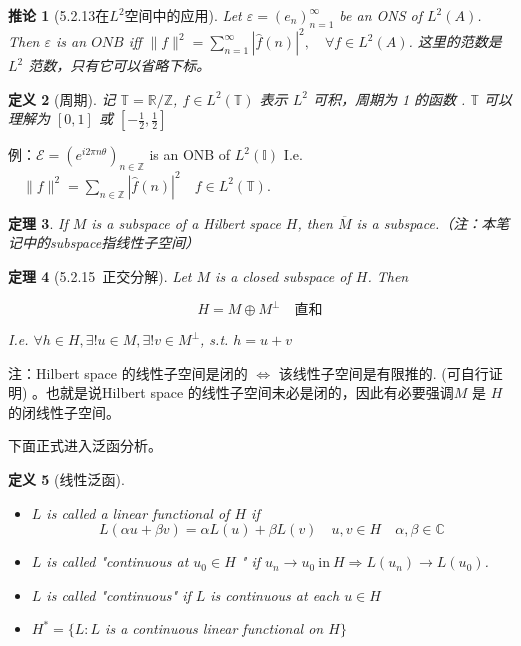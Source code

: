\documentclass[10pt,openany]{book}
\theoremstyle{thmstyle} %
\newtheorem{theorem}{定理}[chapter]
\theoremstyle{defstyle} %
\newtheorem{definition}[theorem]{定义}
\newtheorem{corollary}[theorem]{推论}
\theoremstyle{prostyle} %
\begin{document}
\begin{corollary}[5.2.13在$L^2$空间中的应用]
Let $\varepsilon=\left(e_n\right)_{n=1}^{\infty}$ be an ONS of $L^2(A)$. Then $\varepsilon$ is an $O N B$ iff $\|f\|^2=\sum_{n=1}^{\infty}|\hat{f}(n)|^2, \quad \forall f \in L^2(A)$. 这里的范数是 $L^2$ 范数，只有它可以省略下标。
\end{corollary}

\begin{definition}[周期]
记 $\mathbb{T}=\mathbb{R} / \mathbb{Z}$, $ f \in L^2(\mathbb{T})$ 表示  $L^2$  可积，周期为 1 的函数 . $\mathbb{T}$ 可以理解为 $[0,1]$ 或 $[-\frac{1}{2},\frac{1}{2}]$
\end{definition}

例：$\mathcal{E}=\left(e^{i 2 \pi n \theta}\right)_{n \in \mathbb{Z}}$ is an ONB of $L^2(\mathbb{I})$ I.e. $\quad\|f\|^2=\sum_{n \in \mathbb{Z}}|\hat{f}(n)|^2 \quad f \in L^2(\mathbb{T})$.

\begin{theorem}
If $M$ is a subspace of a Hilbert space $H$, then $\overline{M}$ is a subspace.（注：本笔记中的subspace指线性子空间）
\end{theorem}

\begin{theorem}[5.2.15~正交分解] 
Let $M$ is a closed subspace of $H$. Then

$$
H=M \oplus M^{\perp} \quad \text{直和}
$$

I.e. $\forall h \in H, \exists!u \in M, \exists!v \in M^{\perp}$, s.t. $h=u+v$
\end{theorem}

注：Hilbert space 的线性子空间是闭的 $\Leftrightarrow$ 该线性子空间是有限推的. (可自行证明) 。也就是说Hilbert space 的线性子空间未必是闭的，因此有必要强调$M$ 是 $H$ 的闭线性子空间。


下面正式进入泛函分析。

\begin{definition}[线性泛函] \

\begin{itemize}
  \item $L$ is called a linear functional of $H$ if
        $$
        L(\alpha u+\beta v)=\alpha L(u)+\beta L(v) \quad u, v \in H \quad \alpha, \beta \in \mathbb{C}
        $$
  \item $L$ is called "continuous at $u_0 \in H$ " if $u_n \rightarrow u_0 ~ \text{in} ~ H \Rightarrow L\left(u_n\right) \rightarrow L\left(u_0\right)$.
  \item $L$ is called "continuous" if $L$ is continuous at each $u \in H$
  \item $H^*=\{L: L$ is a continuous linear functional on $H\}$
\end{itemize}

\end{definition}
\end{document}
